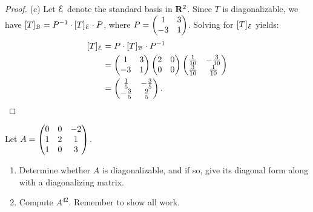 \documentclass[10pt,twoside,openany]{memoir}
\begin{document}
{\begin{proof}
        (c) Let $\mathcal{E}$ denote the standard basis in $\mathbf{R}^2$. Since $T$ is diagonalizable, we have \nl$[T]_{\mathcal{B}} = P^{-1} \cdot [T]_{\mathcal{E}} \cdot P$, where $P = \left( \begin{matrix} 1 & 3 \\ -3 & 1 \end{matrix} \right)$. Solving for $[T]_{\mathcal{E}}$ yields:
            \begin{equation*}
            \begin{split}
                [T]_{\mathcal{E}}
                & = P \cdot [T]_{\mathcal{B}} \cdot P^{-1} \\
                & = \left( \begin{matrix} 1 & 3 \\ -3 & 1 \end{matrix} \right) \left( \begin{matrix} 2 & 0 \\ 0 & 0 \end{matrix} \right) \left( \begin{matrix} \frac{1}{10} & -\frac{3}{10} \\ \frac{3}{10} & \frac{1}{10} \end{matrix} \right) \\
                & = \left( \begin{matrix} \frac{1}{5} & -\frac{3}{5} \\ -\frac{3}{5} & \frac{9}{5} \end{matrix} \right).
            \end{split}
            \end{equation*}
    \end{proof}}
\begin{problem}[S21, P4]
Let $A = \left( \begin{matrix} 0 & 0 & -2 \\ 1 & 2 & 1 \\ 1 & 0 & 3 \end{matrix} \right)$.
\begin{enumerate}[label = (\alph*),itemsep=1pt,topsep=3pt]
    \item Determine whether $A$ is diagonalizable, and if so, give its diagonal form along with a diagonalizing matrix.
    \item Compute $A^{42}$. Remember to show all work.
\end{enumerate}
\end{problem}
\end{document}
